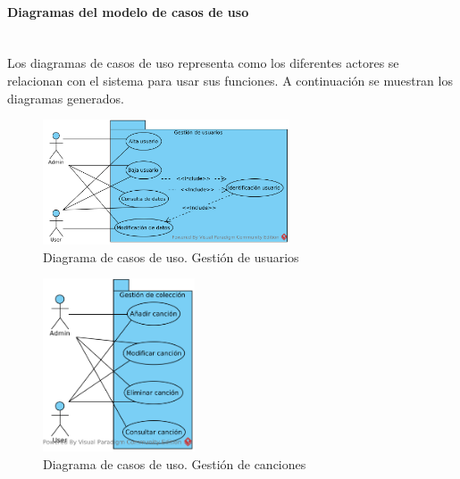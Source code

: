 \paragraph{Diagramas del modelo de casos de uso} \mbox{}\\

Los diagramas de casos de uso representa como los diferentes actores se relacionan con el sistema para usar sus funciones. A continuación se muestran los diagramas generados.

\begin{figure}[H]
  \begin{center}
  \includegraphics[width=0.65\textwidth]{../visual_paradigm_uml/CU-1_Gestion_de_usuarios.png}
  \caption{Diagrama de casos de uso. Gestión de usuarios}
  \label{fig:diag_cu_gu}
  \end{center}
\end{figure}

\begin{figure}[H]
  \begin{center}
  \includegraphics[width=0.4\textwidth]{../visual_paradigm_uml/CU-2_Gestion_de_canciones.png}
  \caption{Diagrama de casos de uso. Gestión de canciones}
  \label{fig:diag_cu_gc}
  \end{center}
\end{figure}


